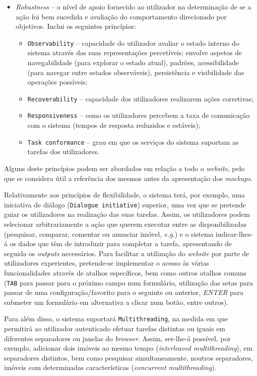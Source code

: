 \begin{itemize}
    \item \textit{Robustness} -- o nível de apoio fornecido ao utilizador na determinação de se a ação foi bem sucedida e avaliação do comportamento direcionado por objetivos. Inclui os seguintes princípios:
    \begin{itemize}
        \item \texttt{Observability} -- capacidade do utilizador avaliar o estado interno do sistema através das suas representações percetíveis; envolve aspetos de navegabilidade (para explorar o estado atual), padrões, acessibilidade (para navegar entre estados observáveis), persistência e visibilidade das operações possíveis;
        \item \texttt{Recoverability} -- capacidade dos utilizadores realizarem ações corretivas;
        \item \texttt{Responsiveness} -- como os utilizadores percebem a taxa de comunicação com o sistema (tempos de resposta reduzidos e estáveis);
        \item \texttt{Task conformance} -- grau em que os serviços do sistema suportam as tarefas dos utilizadores.
    \end{itemize}
\end{itemize}

Alguns deste princípios podem ser abordados em relação a todo o \textit{website}, pelo que se considera útil a referência dos mesmos antes da apresentação dos \textit{mockups}.

Relativamente aos princípios de flexibilidade, o sistema terá, por exemplo, uma iniciativa de diálogo (\texttt{Dialogue initiative}) superior, uma vez que se pretende guiar os utilizadores na realização das suas tarefas. Assim, os utilizadores podem selecionar arbitrariamente a ação que querem executar entre as disponibilizadas (pesquisar, comparar, comentar ou anunciar imóvel, \textit{e.g.}) e o sistema indicar-lhes-á os dados que têm de introduzir para completar a tarefa, apresentando de seguida os \textit{outputs} necessários. Para facilitar a utilização do \textit{website} por parte de utilizadores experientes, pretende-se implementar o acesso às várias funcionalidades através de atalhos específicos, bem como outros atalhos comuns (\texttt{TAB} para passar para o próximo campo num formulário, utilização das setas para passar de uma configuração/favorito para o seguinte ou anterior, \textit{ENTER} para submeter um formulário em alternativa a clicar num botão, entre outros).

Para além disso, o sistema suportará \texttt{Multithreading}, na medida em que permitirá ao utilizador autenticado efetuar tarefas distintas ou iguais em diferentes separadores ou janelas do \textit{browser}. Assim, ser-lhe-á possível, por exemplo, adicionar dois imóveis ao mesmo tempo (\textit{interleaved multithreading}), em separadores distintos, bem como pesquisar simultaneamente, noutros separadores, imóveis com determinadas características (\textit{concurrent multithreading}).

